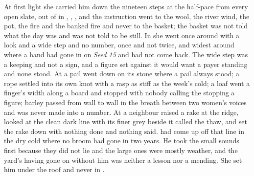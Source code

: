 At first light she carried him down the nineteen steps at the half-pace from every open slate, out of  in , , , and the instruction went to the wool, the river wind, the pot, the fire and the banked fire and never to the basket; the basket was not told what the day was and was not told to be still. In  she went once around  with a look and a wide step and no number, once and not twice, and widest around  where a hand had gone in on \emph{Seed 15} and had not come back. The wide step was a keeping and not a sign, and a figure set against it would want a payer standing and none stood. At  a pail went down on its stone where a pail always stood; a rope settled into its own knot with a rasp as stiff as the week's cold; a loaf went a finger's width along a board and stopped with nobody calling the stopping a figure; barley passed from wall to wall in the breath between two women's voices and was never made into a number. At  a neighbour raised a rake at the ridge, looked at the clean dark line with its finer grey beside it called the thaw, and set the rake down with nothing done and nothing said.  had come up off that line in the dry cold where no broom had gone in two years. He took the small sounds first because they did not lie and the large ones were mostly weather, and the yard's having gone on without him was neither a lesson nor a mending. She set him under the roof and never in .

